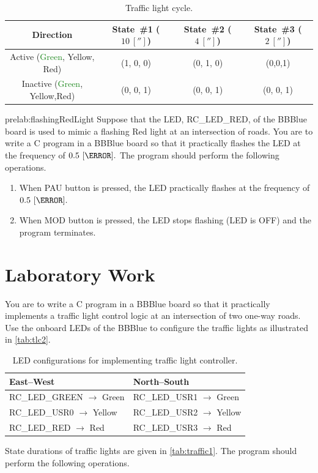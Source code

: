 \begin{table}%
\caption{Traffic light cycle.}
\label{tab:traffic1}
\centering
\begin{tabular}{c|c|c|c}
\toprule
Direction & State~\#1 ($10~[\second]$) & State~\#2 ($4~[\second]$) & State~\#3 ($2~[\second]$)\\
\toprule
Active (\textcolor{ForestGreen}{Green}, \textcolor{YellowOrange}{Yellow}, \textcolor{BrickRed}{Red}) & (1, 0, 0) & (0, 1, 0) & (0,0,1)\\
\hline
Inactive (\textcolor{ForestGreen}{Green}, \textcolor{YellowOrange}{Yellow},\textcolor{BrickRed}{Red}) & (0, 0, 1) & (0, 0, 1) & (0, 0, 1)\\
\bottomrule
\end{tabular}

\end{table}


\begin{prelab}{prelab:flashingRedLight}
  Suppose that the LED, RC\_LED\_RED, of the BBBlue board is used  to mimic a flashing Red light at an intersection of roads. You are to write a C program in a BBBlue board so that it practically flashes the LED at the frequency of $0.5~[\hertz].$ The program should perform the  following operations.
  \begin{enumerate}
  \item When PAU button is pressed, the LED practically flashes at the frequency of $0.5~[\hertz].$
  \item When MOD button is pressed, the LED stops flashing (LED is OFF) and the program terminates.      
  \end{enumerate}
\end{prelab}




\section{Laboratory Work}

You are to write a C program in a BBBlue board so that it practically implements a traffic light control logic at an intersection of  two one-way roads. Use the onboard LEDs of the BBBlue to configure the traffic lights as illustrated in \autoref{tab:tlc2}. %
%
\begin{table}
  \centering
  \caption{LED configurations for implementing traffic light controller. }
  \label{tab:tlc2}  
  \begin{tabular}{l|l}
    \toprule   
    East--West & North--South\\
    \toprule
    RC\_LED\_GREEN $\to$ Green & RC\_LED\_USR1 $\to$ Green\\   	    
    RC\_LED\_USR0 $\to$ Yellow  	  & RC\_LED\_USR2 $\to$ Yellow\\  
    RC\_LED\_RED 	$\to$ Red          & RC\_LED\_USR3 $\to$ Red\\  
    \bottomrule    
  \end{tabular}
\end{table}
%
State durations of traffic lights are given in \autoref{tab:traffic1}. The program should perform the following operations.


